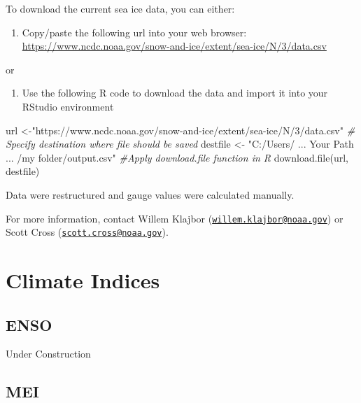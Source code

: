\documentclass[
]{book}
\newenvironment{Shaded}{\begin{snugshade}}{\end{snugshade}}
\newcommand{\CommentTok}[1]{\textcolor[rgb]{0.56,0.35,0.01}{\textit{#1}}}
\newcommand{\FunctionTok}[1]{\textcolor[rgb]{0.00,0.00,0.00}{#1}}
\newcommand{\NormalTok}[1]{#1}
\newcommand{\OtherTok}[1]{\textcolor[rgb]{0.56,0.35,0.01}{#1}}
\newcommand{\StringTok}[1]{\textcolor[rgb]{0.31,0.60,0.02}{#1}}
\providecommand{\tightlist}{%
  \setlength{\itemsep}{0pt}\setlength{\parskip}{0pt}}
\begin{document}
To download the current sea ice data, you can either:

\begin{enumerate}
\def\labelenumi{\arabic{enumi})}
\tightlist
\item
  Copy/paste the following url into your web browser:
  \url{https://www.ncdc.noaa.gov/snow-and-ice/extent/sea-ice/N/3/data.csv}
\end{enumerate}

or

\begin{enumerate}
\def\labelenumi{\arabic{enumi})}
\setcounter{enumi}{1}
\tightlist
\item
  Use the following R code to download the data and import it into your RStudio environment
\end{enumerate}

\begin{Shaded}
\begin{Highlighting}[]
\NormalTok{url }\OtherTok{\textless{}{-}}\StringTok{"https://www.ncdc.noaa.gov/snow{-}and{-}ice/extent/sea{-}ice/N/3/data.csv"}
\CommentTok{\# Specify destination where file should be saved}
\NormalTok{destfile }\OtherTok{\textless{}{-}} \StringTok{"C:/Users/ ... Your Path ... /my folder/output.csv"}
\CommentTok{\#Apply download.file function in R}
\FunctionTok{download.file}\NormalTok{(url, destfile)}
\end{Highlighting}
\end{Shaded}

Data were restructured and gauge values were calculated manually.

For more information, contact Willem Klajbor (\href{mailto:willem.klajbor@noaa.gov}{\nolinkurl{willem.klajbor@noaa.gov}}) or Scott Cross (\href{mailto:scott.cross@noaa.gov}{\nolinkurl{scott.cross@noaa.gov}}).

\hypertarget{climate-indices}{%
\chapter{Climate Indices}\label{climate-indices}}

\hypertarget{enso}{%
\section{ENSO}\label{enso}}

Under Construction

\hypertarget{mei}{%
\section{MEI}\label{mei}}
\end{document}
